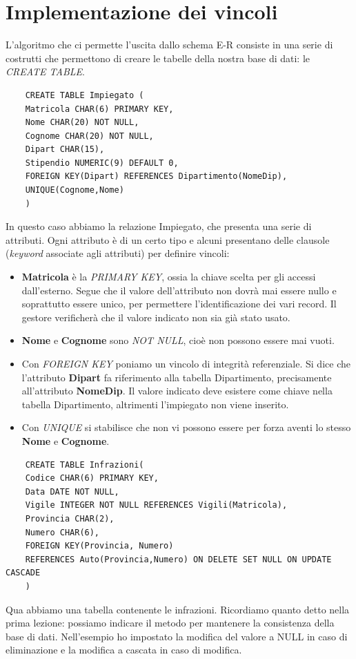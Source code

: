 \section{Implementazione dei vincoli}
L'algoritmo che ci permette l'uscita dallo schema E-R consiste in una serie di costrutti che permettono di creare le tabelle della nostra base di dati: le \emph{CREATE TABLE}.
\small
\begin{verbatim}
	CREATE TABLE Impiegato (
	Matricola CHAR(6) PRIMARY KEY,
	Nome CHAR(20) NOT NULL,
	Cognome CHAR(20) NOT NULL,
	Dipart CHAR(15),
	Stipendio NUMERIC(9) DEFAULT 0,
	FOREIGN KEY(Dipart) REFERENCES Dipartimento(NomeDip),
	UNIQUE(Cognome,Nome)
	)
\end{verbatim}
\normalsize
In questo caso abbiamo la relazione Impiegato, che presenta una serie di attributi. Ogni attributo è di un certo tipo e alcuni presentano delle clausole (\emph{keyword} associate agli attributi) per definire vincoli:
\begin{itemize}
	\item \textbf{Matricola} è la \emph{PRIMARY KEY}, ossia la chiave scelta per gli accessi dall'esterno. Segue che il valore dell'attributo non dovrà mai essere nullo e soprattutto essere unico, per permettere l'identificazione dei vari record. Il gestore verificherà che il valore indicato non sia già stato usato.
	\item \textbf{Nome} e \textbf{Cognome} sono \emph{NOT NULL}, cioè non possono essere mai vuoti.
	\item Con \emph{FOREIGN KEY} poniamo un vincolo di integrità referenziale. Si dice che l'attributo \textbf{Dipart} fa riferimento alla tabella Dipartimento, precisamente all'attributo \textbf{NomeDip}. Il valore indicato deve esistere come chiave nella tabella Dipartimento, altrimenti l'impiegato non viene inserito.
	\item Con \emph{UNIQUE} si stabilisce che non vi possono essere per forza aventi lo stesso \textbf{Nome} e \textbf{Cognome}.
\end{itemize}
\small
\begin{verbatim}
	CREATE TABLE Infrazioni(
	Codice CHAR(6) PRIMARY KEY,
	Data DATE NOT NULL,
	Vigile INTEGER NOT NULL REFERENCES Vigili(Matricola),
	Provincia CHAR(2),
	Numero CHAR(6),
	FOREIGN KEY(Provincia, Numero) 
	REFERENCES Auto(Provincia,Numero) ON DELETE SET NULL ON UPDATE CASCADE
	)	
\end{verbatim}
\normalsize
Qua abbiamo una tabella contenente le infrazioni. Ricordiamo quanto detto nella prima lezione: possiamo indicare il metodo per mantenere la consistenza della base di dati. Nell'esempio ho impostato la modifica del valore a NULL in caso di eliminazione e la modifica a cascata in caso di modifica.

